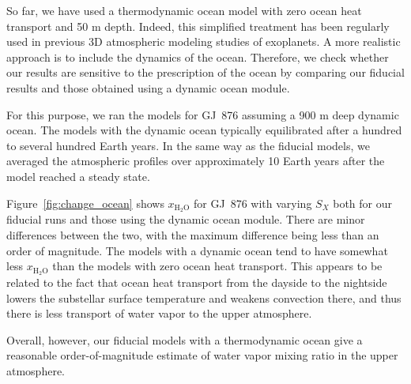 \documentclass[11pt,numberedappendix,twocolappendix,]{emulateapj}
\def\water{H$_2$O}
\def\xwater{$x_\text{\water}$}
\def\wv{water vapor}
\newcommand{\yf}[1]{{\color{orange}#1}}
\begin{document}
So far, we have used a thermodynamic ocean model with zero ocean heat transport and 50 m depth. 
Indeed, this simplified treatment has been regularly used in \yf{previous 3D atmospheric modeling studies of exoplanets}. 
A more realistic approach is to include the dynamics of the ocean. 
Therefore, we check whether our results are sensitive to the prescription of the ocean by comparing our fiducial results and those obtained using a dynamic ocean module. 

For this purpose, we ran the models for GJ~876 assuming a 900 m deep dynamic ocean. 
The models with the dynamic ocean typically equilibrated after a hundred to several hundred Earth years. 
In the same way as the fiducial models, we averaged the atmospheric profiles  over approximately 10 Earth years after the model reached a steady state. 

Figure~\ref{fig:change_ocean} shows \xwater{} for GJ~876 with varying $S_X$ both for our fiducial runs and those using the dynamic ocean module.  
\yf{There are minor differences between the two, with the maximum difference being less than an order of magnitude. }
\yf{The models with a dynamic ocean tend to have somewhat less \xwater{} than the models with zero ocean heat transport. }
\yf{This appears to be related to the fact that ocean heat transport from the dayside to the nightside lowers the substellar surface temperature and weakens convection there, and thus there is less transport of water vapor to the upper atmosphere. }


Overall, however, our fiducial models with a thermodynamic ocean give a reasonable order-of-magnitude estimate of \wv{} mixing ratio in the upper atmosphere. 
\end{document}
